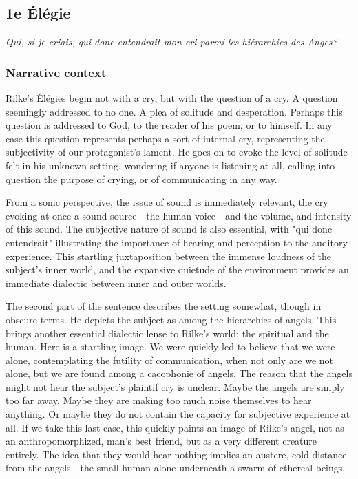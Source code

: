\documentclass[12pt,twoside,maitrise]{dms}
\theoremstyle{definition}
\begin{document}
\subsection{1e Élégie}

\epigraph{\textit{Qui, si je criais, qui donc entendrait mon cri parmi les hiérarchies des Anges?}}{}

\subsubsection{Narrative context}
Rilke's Élégies begin not with a cry, but with the question of a cry.
A question seemingly addressed to no one.
A plea of solitude and desperation.
Perhaps this question is addressed to God, to the reader of his poem, or to himself.
In any case this question represents perhaps a sort of internal cry, representing the subjectivity of our protagonist's lament.
He goes on to evoke the level of solitude felt in his unknown setting, wondering if anyone is listening at all, calling into question the purpose of crying, or of communicating in any way.

From a sonic perspective, the issue of sound is immediately relevant, the cry evoking at once a sound source---the human voice---and the volume, and intensity of this sound.
The subjective nature of sound is also essential, with "qui donc entendrait" illustrating the importance of hearing and perception to the auditory experience.
This startling juxtaposition between the immense loudness of the subject's inner world, and the expansive quietude of the environment provides an immediate dialectic between inner and outer worlds.

The second part of the sentence describes the setting somewhat, though in obscure terms.
He depicts the subject as among the hierarchies of angels.
This brings another essential dialectic lense to Rilke's world: the spiritual and the human.
Here is a startling image.
We were quickly led to believe that we were alone, contemplating the futility of communication, when not only are we not alone, but we are found among a cacophonie of angels.
The reason that the angels might not hear the subject's plaintif cry is unclear. 
Maybe the angels are simply too far away.
Maybe they are making too much noise themselves to hear anything.
Or maybe they do not contain the capacity for subjective experience at all.
If we take this last case, this quickly paints an image of Rilke's angel, not as an anthropomorphized, man's best friend, but as a very different creature entirely.
The idea that they would hear nothing implies an austere, cold distance from the angels---the small human alone underneath a swarm of ethereal beings.
\end{document}
